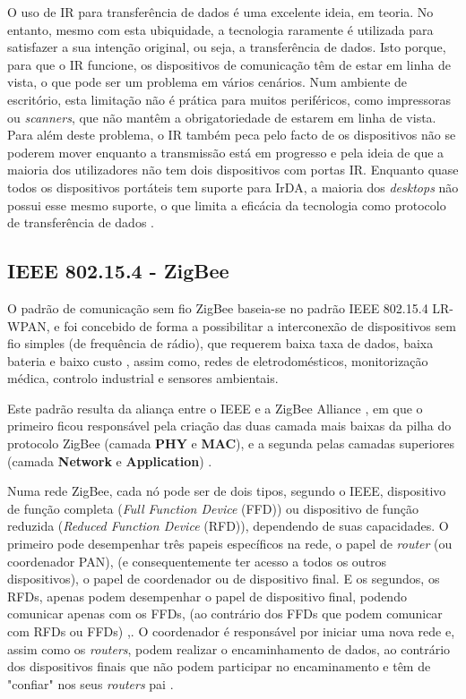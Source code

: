 \documentclass[conference]{IEEEtran}
\begin{document}
O uso de IR para transferência de dados é uma excelente ideia, em teoria. 
No entanto, mesmo com esta ubiquidade, a tecnologia raramente é utilizada para satisfazer a sua intenção original, ou seja, a transferência de dados. 
Isto porque, para que o IR funcione, os dispositivos de comunicação têm de estar em linha de vista, o que pode ser um problema em vários cenários. 
Num ambiente de escritório, esta limitação não é prática para muitos periféricos, como impressoras ou \textit{scanners}, que não mantêm a obrigatoriedade de estarem em linha de vista. 
Para além deste problema, o IR também peca pelo facto de os dispositivos não se poderem mover enquanto a transmissão está em progresso e pela ideia de que a maioria dos utilizadores não tem dois dispositivos com portas IR. 
Enquanto quase todos os dispositivos portáteis tem suporte para IrDA, a maioria dos \textit{desktops} não possui esse mesmo suporte, o que limita a eficácia da tecnologia como protocolo de transferência de dados \cite{wpanonline}.


\subsection{IEEE 802.15.4 - ZigBee}

O padrão de comunicação sem fio ZigBee baseia-se no padrão IEEE 802.15.4 LR-WPAN, e foi concebido de forma a possibilitar a interconexão de dispositivos sem fio simples (de frequência de rádio), que requerem baixa taxa de dados, baixa bateria e baixo custo \cite{kennedy2008review}, assim como, redes de eletrodomésticos, monitorização médica, controlo industrial e sensores ambientais.

Este padrão resulta da aliança entre o IEEE e a ZigBee Alliance , em que o primeiro ficou responsável pela criação das duas camada mais baixas da pilha do protocolo ZigBee (camada \textbf{PHY} e \textbf{MAC}), e a segunda pelas camadas superiores (camada \textbf{Network} e \textbf{Application}) \cite{liang2006impact}.

Numa rede ZigBee, cada nó pode ser de dois tipos, segundo o IEEE, dispositivo de função completa (\textit{Full Function Device} (FFD)) ou dispositivo de função reduzida (\textit{Reduced Function Device} (RFD)), dependendo de suas capacidades.
O primeiro pode desempenhar três papeis específicos na rede, o papel de \textit{router} (ou coordenador PAN), (e consequentemente ter acesso a todos os outros dispositivos), o papel de coordenador ou de dispositivo final.
E os segundos, os RFDs, apenas podem desempenhar o papel de dispositivo final, podendo comunicar apenas com os FFDs, (ao contrário dos FFDs que podem comunicar com RFDs ou FFDs) \cite{liang2006impact},\cite{sinem2004zigbee}.
O coordenador é responsável por iniciar uma nova rede e, assim como os \textit{routers}, podem realizar o encaminhamento de dados, ao contrário dos dispositivos finais que não podem participar no encaminamento e têm de "confiar" nos seus \textit{routers} pai \cite{liang2006impact}.
\end{document}
